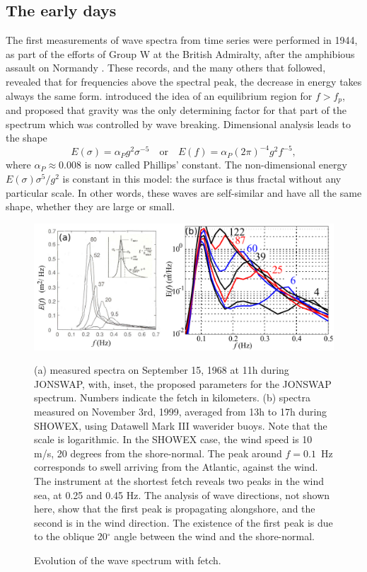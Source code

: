 \subsection{The early days}
The first measurements of wave spectra from time series were performed in 1944, as part of the efforts of Group W at the British Admiralty, 
after the amphibious assault on Normandy  \citep[][]{Barber&al.1946,Ursell1999}. These records, and the many others that followed, 
revealed that for frequencies above the spectral peak, the decrease in energy takes always the same form. \cite{Phillips1958}
 introduced the idea of an  equilibrium region for
$f>f_p$, and proposed that gravity was the only determining factor for that part of the spectrum which was controlled by wave breaking.  
Dimensional analysis leads to the shape 
\begin{equation}
   E(\sigma)=\alpha_P g^2 \sigma^{-5} \quad \mathrm{or} \quad E(f)=\alpha_P \left(2\pi\right)^{-4} g^2 f^{-5},
\end{equation}
where $\alpha_P\approx 0.008$ is now called Phillips' constant. The non-dimensional energy $E(\sigma) \sigma^{5}/g^2$ is constant
in this model: the surface is thus fractal without any particular scale. In other words, these waves are self-similar and have all the same shape, whether they are large or small. 
\begin{figure}[!hbt]
\centerline{\includegraphics[width=\textwidth]{FIGS_CH_FETCH/overshoot_JONSWAP_SHOWEX.pdf}}
  \caption{Evolution of the wave spectrum with fetch.}{(a) measured spectra on September 15, 1968 at 11h
  during JONSWAP, with, inset, the proposed parameters for the JONSWAP spectrum. Numbers indicate the fetch in kilometers. (b) spectra measured on November 3rd, 1999, averaged from 13h to 17h during SHOWEX, 
using Datawell Mark III waverider buoys. 
Note that the scale is logarithmic. In the SHOWEX case, the wind speed is 10 m/s, 20 degrees from the shore-normal. The peak around $f=0.1$~Hz
  corresponds to swell arriving from the Atlantic, against the wind. The instrument at the shortest fetch 
reveals two peaks in the wind sea, at 0.25 and 0.45 Hz. The analysis of wave directions, not shown here, show that the first peak is propagating 
alongshore, and the second is in the 
wind direction. The existence of the first peak is due to the oblique 20$^\circ$ angle between the wind and the shore-normal.}
\label{fig_overshoot}
\end{figure}
